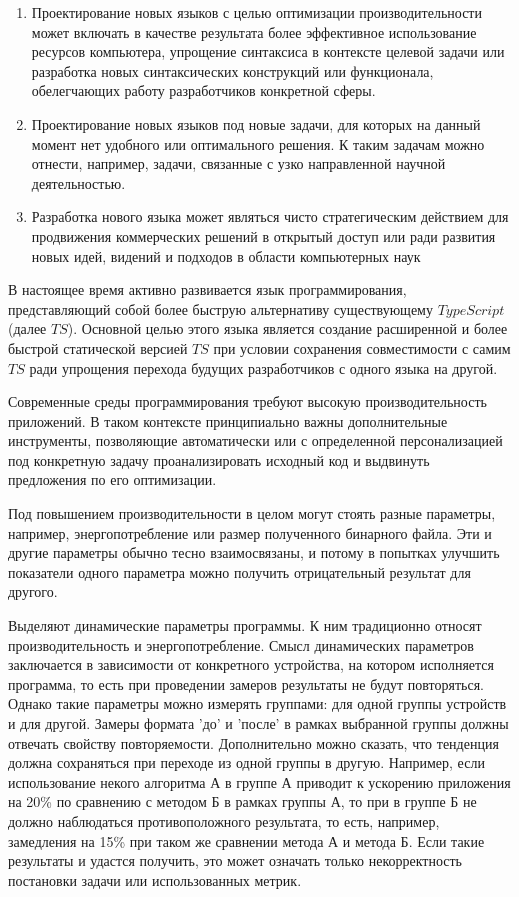 \documentclass{mipt-thesis-bs}
\begin{document}
\begin{enumerate}
    \item Проектирование новых языков с целью оптимизации производительности
    может включать в качестве результата более эффективное использование
    ресурсов компьютера, упрощение синтаксиса в контексте целевой задачи
    или разработка новых синтаксических конструкций или функционала,
    обелегчающих работу разработчиков конкретной сферы.
    \item  Проектирование новых языков под новые задачи, для которых на данный
    момент нет удобного или оптимального решения. К таким задачам можно отнести,
    например, задачи, связанные с узко направленной научной деятельностью.
    \item Разработка нового языка может являться чисто стратегическим действием
    для продвижения коммерческих решений в открытый доступ или ради развития
    новых идей, видений и подходов в области компьютерных наук
\end{enumerate}

В настоящее время активно развивается язык программирования, представляющий собой
более быструю альтернативу существующему $TypeScript$ (далее $TS$). Основной целью этого языка
является создание расширенной и более быстрой статической версией $TS$ при
условии сохранения совместимости с самим $TS$ ради упрощения перехода будущих разработчиков
с одного языка на другой.

Современные среды программирования требуют высокую производительность приложений. В таком
контексте принципиально важны дополнительные инструменты, позволяющие автоматически или с
определенной персонализацией под конкретную задачу проанализировать исходный код и выдвинуть
предложения по его оптимизации.

Под повышением производительности в целом могут стоять разные параметры, например,
энергопотребление или размер полученного бинарного файла. Эти и другие параметры обычно
тесно взаимосвязаны, и потому в попытках улучшить показатели одного параметра можно получить
отрицательный результат для другого.

Выделяют динамические параметры программы. К ним традиционно относят производительность
и энергопотребление. Смысл динамических параметров заключается в зависимости от конкретного устройства,
на котором исполняется программа, то есть при проведении замеров результаты не будут повторяться.
Однако такие параметры можно измерять группами: для одной группы устройств и для другой.
Замеры формата 'до' и 'после' в рамках выбранной группы должны отвечать свойству повторяемости.
Дополнительно можно сказать, что тенденция должна сохраняться при переходе из одной группы в другую.
Например, если использование некого алгоритма А в группе А приводит к ускорению приложения на 20\% по
сравнению с методом Б в рамках группы А, то при в группе Б не должно наблюдаться противоположного результата,
то есть, например, замедления на 15\% при таком же сравнении метода А и метода Б. Если такие результаты и
удастся получить, это может означать только некорректность постановки задачи или использованных метрик.
\end{document}
